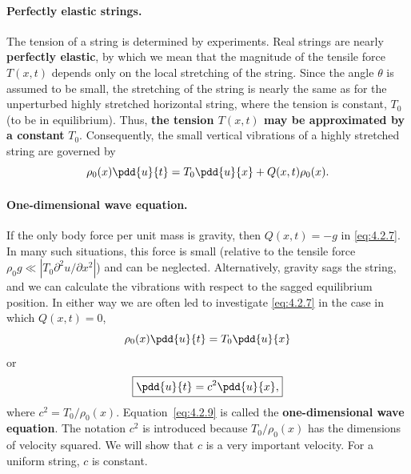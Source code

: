 \paragraph{Perfectly elastic strings.}
The tension of a string is determined by experiments.  Real strings are nearly \textbf{perfectly elastic}, by which we mean that the magnitude of the tensile force $T(x,t)$ depends only on the local stretching of the string.  Since the angle $\theta$ is assumed to be small, the stretching of the string is nearly the same as for the unperturbed highly stretched horizontal string, where the tension is constant, $T_0$ (to be in equilibrium).  Thus, \textbf{the tension $T(x,t)$ may be approximated by a constant} $T_0$.  Consequently, the small vertical vibrations of a highly stretched string are governed by
\begin{equation}
\rho_0(x)\pdd{u}{t} = T_0\pdd{u}{x} + Q(x,t)\rho_0(x).
\label{eq:4.2.7}
\end{equation}

\paragraph{One-dimensional wave equation.}
If the only body force per unit mass is gravity, then $Q(x,t) = -g$ in \eqref{eq:4.2.7}.  In many such situations, this force is small (relative to the tensile force $\rho_0 g \ll |T_0\partial^2 u/\partial x^2|$) and can be neglected.  Alternatively, gravity sags the string, and we can calculate the vibrations with respect to the sagged equilibrium position.  In either way we are often led to investigate \eqref{eq:4.2.7} in the case in which $Q(x,t) = 0$,
\begin{equation}
\rho_0(x)\pdd{u}{t} = T_0\pdd{u}{x}
\label{eq:4.2.8}
\end{equation}
or
\begin{equation}
\boxed{\pdd{u}{t} = c^2\pdd{u}{x},}
\label{eq:4.2.9}
\end{equation}
where $c^2 = T_0/\rho_0(x)$.  Equation~\eqref{eq:4.2.9} is called the \textbf{one-dimensional wave equation}.  The notation $c^2$ is introduced because $T_0/\rho_0(x)$ has the dimensions of velocity squared.  We will show that $c$ is a very important velocity.  For a uniform string, $c$ is constant.

